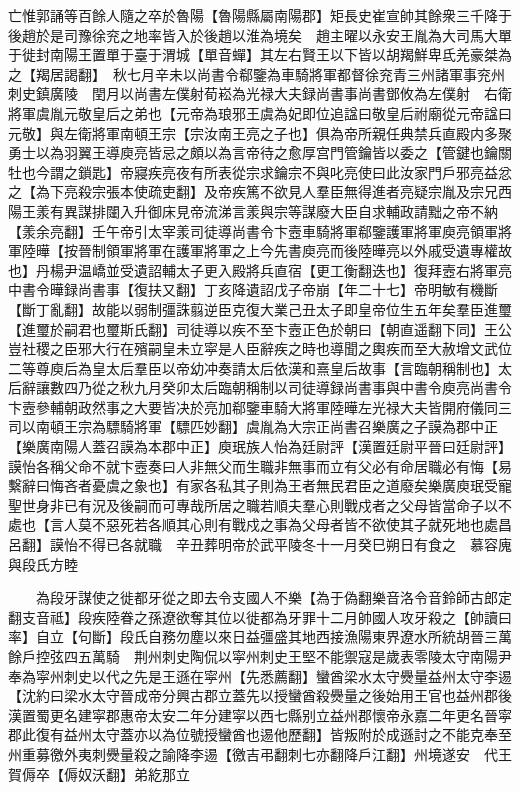 亡惟郭誦等百餘人隨之卒於魯陽【魯陽縣屬南陽郡】矩長史崔宣帥其餘衆三千降于後趙於是司豫徐兖之地率皆入於後趙以淮為境矣　趙主曜以永安王胤為大司馬大單于徙封南陽王置單于臺于渭城【單音蟬】其左右賢王以下皆以胡羯鮮卑氐羌豪桀為之【羯居謁翻】　秋七月辛未以尚書令郗鑒為車騎將軍都督徐兖青三州諸軍事兖州刺史鎮廣陵　閏月以尚書左僕射荀崧為光禄大夫録尚書事尚書鄧攸為左僕射　右衛將軍虞胤元敬皇后之弟也【元帝為琅邪王虞為妃即位追諡曰敬皇后祔廟從元帝諡曰元敬】與左衛將軍南頓王宗【宗汝南王亮之子也】俱為帝所親任典禁兵直殿内多聚勇士以為羽翼王導庾亮皆忌之頗以為言帝待之愈厚宫門管鑰皆以委之【管鍵也鑰關牡也今謂之鎖匙】帝寢疾亮夜有所表從宗求鑰宗不與叱亮使曰此汝家門戶邪亮益忿之【為下亮殺宗張本使疏吏翻】及帝疾篤不欲見人羣臣無得進者亮疑宗胤及宗兄西陽王羕有異謀排闥入升御床見帝流涕言羕與宗等謀廢大臣自求輔政請黜之帝不納【羕余亮翻】壬午帝引太宰羕司徒導尚書令卞壼車騎將軍郗鑒護軍將軍庾亮領軍將軍陸曄【按晉制領軍將軍在護軍將軍之上今先書庾亮而後陸曄亮以外戚受遺專權故也】丹楊尹温嶠並受遺詔輔太子更入殿將兵直宿【更工衡翻迭也】復拜壼右將軍亮中書令曄録尚書事【復扶又翻】丁亥降遺詔戊子帝崩【年二十七】帝明敏有機斷【斷丁亂翻】故能以弱制彊誅翦逆臣克復大業己丑太子即皇帝位生五年矣羣臣進璽【進璽於嗣君也璽斯氏翻】司徒導以疾不至卞壼正色於朝曰【朝直遥翻下同】王公豈社稷之臣邪大行在殯嗣皇未立寜是人臣辭疾之時也導聞之輿疾而至大赦增文武位二等尊庾后為皇太后羣臣以帝幼冲奏請太后依漢和熹皇后故事【言臨朝稱制也】太后辭讓數四乃從之秋九月癸卯太后臨朝稱制以司徒導録尚書事與中書令庾亮尚書令卞壼參輔朝政然事之大要皆决於亮加郗鑒車騎大將軍陸曄左光禄大夫皆開府儀同三司以南頓王宗為驃騎將軍【驃匹妙翻】虞胤為大宗正尚書召樂廣之子謨為郡中正【樂廣南陽人蓋召謨為本郡中正】庾珉族人怡為廷尉評【漢置廷尉平晉曰廷尉評】謨怡各稱父命不就卞壼奏曰人非無父而生職非無事而立有父必有命居職必有悔【易繫辭曰悔吝者憂虞之象也】有家各私其子則為王者無民君臣之道廢矣樂廣庾珉受寵聖世身非已有況及後嗣而可專哉所居之職若順夫羣心則戰戍者之父母皆當命子以不處也【言人莫不惡死若各順其心則有戰戍之事為父母者皆不欲使其子就死地也處昌呂翻】謨怡不得已各就職　辛丑葬明帝於武平陵冬十一月癸巳朔日有食之　慕容廆與段氏方睦

　　為段牙謀使之徙都牙從之即去令支國人不樂【為于偽翻樂音洛令音鈴師古郎定翻支音祗】段疾陸眷之孫遼欲奪其位以徙都為牙罪十二月帥國人攻牙殺之【帥讀曰率】自立【句斷】段氏自務勿塵以來日益彊盛其地西接漁陽東界遼水所統胡晉三萬餘戶控弦四五萬騎　荆州刺史陶侃以寜州刺史王堅不能禦寇是歲表零陵太守南陽尹奉為寜州刺史以代之先是王遜在寜州【先悉薦翻】蠻酋梁水太守㸑量益州太守李逷【沈約曰梁水太守晉成帝分興古郡立蓋先以授蠻酋殺㸑量之後始用王官也益州郡後漢置蜀更名建寜郡惠帝太安二年分建寜以西七縣别立益州郡懷帝永嘉二年更名晉寜郡此復有益州太守蓋亦以為位號授蠻酋也逷他歷翻】皆叛附於成遜討之不能克奉至州重募徼外夷刺㸑量殺之諭降李逷【徼吉弔翻刺七亦翻降戶江翻】州境遂安　代王賀傉卒【傉奴沃翻】弟紇那立

